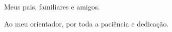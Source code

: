 \begin{agradecimentos}

Meus pais, familiares e amigos.

Ao meu orientador, por toda a paciência e dedicação. 

\end{agradecimentos}